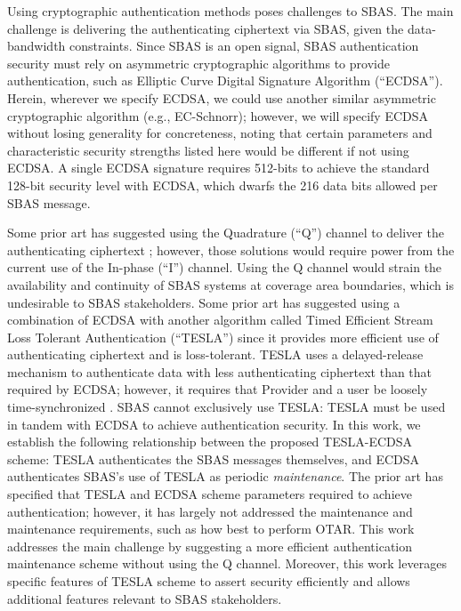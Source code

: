 \documentclass[letterpaper,times]{IONconf/IONconf}
\begin{document}
	Using cryptographic authentication methods poses challenges to SBAS.
	The main challenge is delivering the authenticating ciphertext via SBAS, given the data-bandwidth constraints.
	Since SBAS is an open signal, SBAS authentication security must rely on asymmetric cryptographic algorithms to provide authentication, such as Elliptic Curve Digital Signature Algorithm (``ECDSA'').
	Herein, wherever we specify ECDSA, we could use another similar asymmetric cryptographic algorithm (e.g., EC-Schnorr); however, we will specify ECDSA without losing generality for concreteness, noting that certain parameters and characteristic security strengths listed here would be different if not using ECDSA.
	A single ECDSA signature requires 512-bits to achieve the standard 128-bit security level with ECDSA, which dwarfs the 216 data bits allowed per SBAS message.

	Some prior art has suggested using the Quadrature (``Q'') channel to deliver the authenticating ciphertext \cite{todd-pki-scheme, other_schemes}; however, those solutions would require power from the current use of the In-phase (``I'') channel.
	Using the Q channel would strain the availability and continuity of SBAS systems at coverage area boundaries, which is undesirable to SBAS stakeholders.
	Some prior art has suggested using a combination of ECDSA with another algorithm called Timed Efficient Stream Loss Tolerant Authentication (``TESLA'') \cite{Neish_Dissertation, gal-os-tesla} since it provides more efficient use of authenticating ciphertext and is loss-tolerant.
	TESLA uses a delayed-release mechanism to authenticate data with less authenticating ciphertext than that required by ECDSA; however, it requires that Provider and a user be loosely time-synchronized \cite{perrig2005timed}.
	SBAS cannot exclusively use TESLA: TESLA must be used in tandem with ECDSA to achieve authentication security.
	In this work, we establish the following relationship between the proposed TESLA-ECDSA scheme: TESLA authenticates the SBAS messages themselves, and ECDSA authenticates SBAS's use of TESLA as periodic {\em maintenance}.
	The prior art has specified that TESLA and ECDSA scheme parameters required to achieve authentication; however, it has largely not addressed the maintenance and maintenance requirements, such as how best to perform OTAR.
	This work addresses the main challenge by suggesting a more efficient authentication maintenance scheme without using the Q channel.
	Moreover, this work leverages specific features of TESLA scheme to assert security efficiently \cite{chain-security} and allows additional features relevant to SBAS stakeholders.
\end{document}
